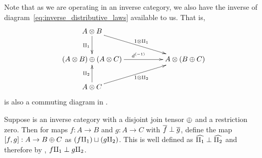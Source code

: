 Note that as we are operating in an inverse category, we also have the inverse of
diagram~\ref{eq:inverse_distributive_laws} available to us. That is,
\begin{equation}
  \xymatrix{
  A\*B \ar[d]_{\cpa} \ar[drr]^{1\*\cpa}\\
  (A\*B) \+ (A \* C)  \ar[rr]^{\inv{d}}  &&A \* (B \+ C) \\
  A\*C\ar[u]^{\cpb} \ar[urr]_{1\*\cpb}
  }\label{eq:inverse_distributive_laws_reversed}
\end{equation}
is also a commuting diagram in \D.

\begin{definition}\label{def:join_of_perp_rst_maps}
  Suppose \X is an inverse category with a disjoint join tensor $\oplus$ and a restriction zero. Then
  for maps $f:A \to B$ and $g:A \to C$ with $\overline{f} \perp \overline{g}$, define the map $[f,g]:A \to
  B\oplus C$ as $(f \amalg_{1}) \sqcup (g \amalg_{2})$. This is well defined as $\widehat{\amalg_{1}} \perp \widehat{\amalg_{2}}$ and
  therefore by , $f\amalg_{1} \perp g\amalg_{2}$.
\end{definition}

